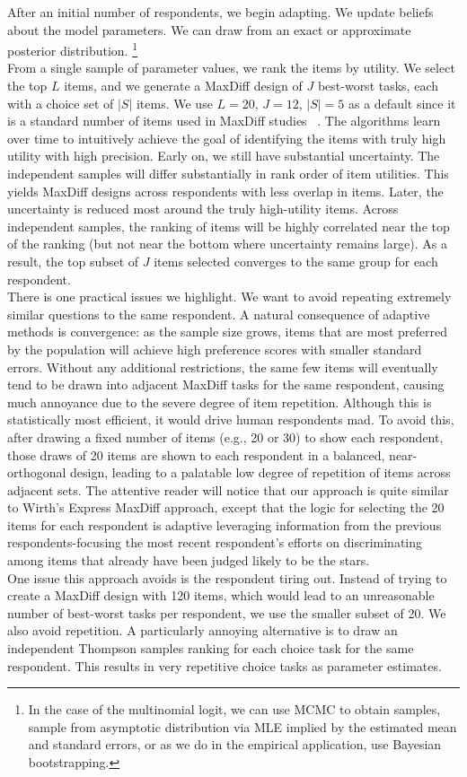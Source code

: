 \documentclass[nonblindrev]{informs3}
\begin{document}
After an initial number of respondents, we begin adapting. We update beliefs about the model parameters. We can draw from an exact or approximate posterior distribution. \footnote{In the case of the multinomial logit, we can use MCMC to obtain samples, sample from asymptotic distribution via MLE implied by the estimated mean and standard errors, or as we do in the empirical application, use Bayesian bootstrapping.}\\
From a single sample of parameter values, we rank the items by utility. We select the top $L$ items, and we generate a MaxDiff design of $J$ best-worst tasks, each with a choice set of $|S|$ items.  We use $L=20$, $J=12$, $|S|=5$ as a default since it is a standard number of items used in MaxDiff studies ~\cite{wirth2012largeset}. 
The algorithms learn over time to intuitively achieve the goal of identifying the items with truly high utility with high precision. Early on, we still have substantial uncertainty. The independent samples will differ substantially in rank order of item utilities. This yields MaxDiff designs across respondents with less overlap in items. Later, the uncertainty is reduced most around the truly high-utility items. Across independent samples, the ranking of items will be highly correlated near the top of the ranking (but not near the bottom where uncertainty remains large). As a result, the top subset of $J$ items selected converges to the same group for each respondent. \\
There is one practical issues we highlight. We want to avoid repeating extremely similar questions to the same respondent. A natural consequence of adaptive methods is convergence: as the sample size grows, items that are most preferred by the population will achieve high preference scores with smaller standard errors.  Without any additional restrictions, the same few items will eventually tend to be drawn into adjacent MaxDiff tasks for the same respondent, causing much annoyance due to the severe degree of item repetition.  Although this is statistically most efficient, it would drive human respondents mad.  To avoid this, after drawing a fixed number of items (e.g., 20 or 30) to show each respondent,  those draws of 20 items are shown to each respondent in a balanced, near-orthogonal design, leading to a palatable low degree of repetition of items across adjacent sets.  The attentive reader will notice that our approach is quite similar to Wirth's Express MaxDiff approach, except that the logic for selecting the 20 items for each respondent is adaptive leveraging information from the previous respondents-focusing the most recent respondent's efforts on discriminating among items that already have been judged likely to be the stars.\\
One issue this approach avoids is the respondent tiring out. Instead of trying to create a MaxDiff design with 120 items, which would lead to an unreasonable number of best-worst tasks per respondent, we use the smaller subset of 20.  We also avoid repetition. A particularly annoying alternative is to draw an independent Thompson samples ranking for each choice task for the same respondent. This results in very repetitive choice tasks as parameter estimates. \\
\end{document}
